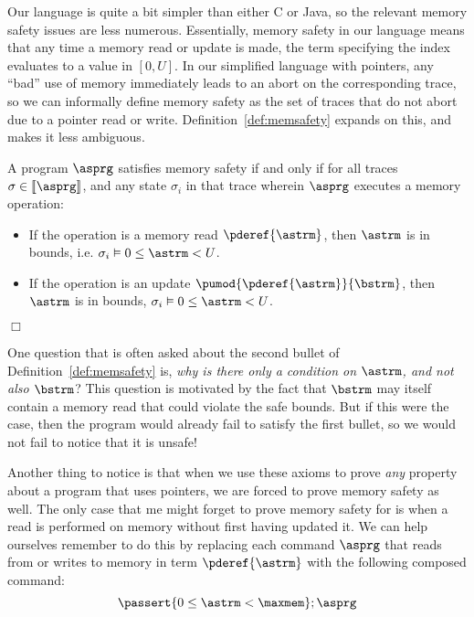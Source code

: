 \documentclass[11pt,twoside]{scrartcl}
\begin{document}
Our language is quite a bit simpler than either C or Java, so the relevant memory safety issues are less numerous.
Essentially, memory safety in our language means that any time a memory read or update is made, the term specifying the index evaluates to a value in $[0,U]$.
In our simplified language with pointers, any ``bad'' use of memory immediately leads to an abort on the corresponding trace, so we can informally define memory safety as the set of traces that do not abort due to a pointer read or write.
Definition~\ref{def:memsafety} expands on this, and makes it less ambiguous.

\begin{definition}
\label{def:memsafety}
A program $\asprg$ satisfies memory safety if and only if for all traces $\sigma \in \llbracket\asprg\rrbracket$, and any state $\sigma_i$ in that trace wherein $\asprg$ executes a memory operation:
\begin{itemize}
\item If the operation is a memory read $\pderef{\astrm}$, then $\astrm$ is in bounds, i.e. $\sigma_i \vDash 0 \le \astrm < U$.
\item If the operation is an update $\pumod{\pderef{\astrm}}{\bstrm}$, then $\astrm$ is in bounds, $\sigma_i \vDash 0 \le \astrm < U$.
\end{itemize}
$\Box$
\end{definition}

One question that is often asked about the second bullet of Definition~\ref{def:memsafety} is, \emph{why is there only a condition on $\astrm$, and not also $\bstrm$}?
This question is motivated by the fact that $\bstrm$ may itself contain a memory read that could violate the safe bounds.
But if this were the case, then the program would already fail to satisfy the first bullet, so we would not fail to notice that it is unsafe!

Another thing to notice is that when we use these axioms to prove \emph{any} property about a program that uses pointers, we are forced to prove memory safety as well. The only case that me might forget to prove memory safety for is when a read is performed on memory without first having updated it. We can help ourselves remember to do this by replacing each command $\asprg$ that reads from or writes to memory in term $\pderef{\astrm}$ with the following composed command:
\begin{equation}
\label{eq:memorysafe}
\passert{0 \le \astrm < \maxmem};\asprg
\end{equation}
\end{document}
